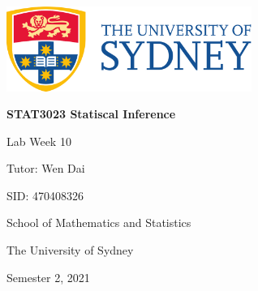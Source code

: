 \includegraphics[width=8cm]{./UsydLogo}

\vspace{1cm}


\horline
{\centering\bfseries \Large \textsc{STAT3023} Statiscal Inference

}
\horline

\vspace{3cm}

{\large \centering Lab Week 10

}

{\centering

\vspace{1cm}

Tutor: Wen Dai

SID: 470408326

\vspace{1cm}

School of Mathematics and Statistics

The University of Sydney

\vfill

Semester 2, 2021\newpage

}
